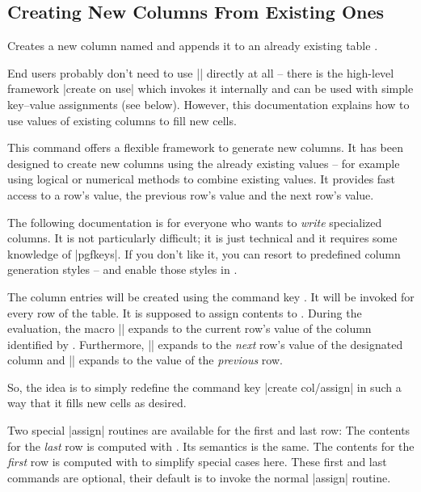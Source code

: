 \subsection{Creating New Columns From Existing Ones}

\begin{command}{\pgfplotstablecreatecol{}}
    Creates a new column named  and appends it to an already
    existing table .

    End users probably don't need to use |\pgfplotstablecreatecol| directly at
    all -- there is the high-level framework |create on use| which invokes it
    internally and can be used with simple key--value assignments (see below).
    However, this documentation explains how to use values of existing columns
    to fill new cells.

    This command offers a flexible framework to generate new columns. It has
    been designed to create new columns using the already existing values --
    for example using logical or numerical methods to combine existing values.
    It provides fast access to a row's value, the previous row's value and the
    next row's value.

    The following documentation is for everyone who wants to \emph{write}
    specialized columns. It is not particularly difficult; it is just technical
    and it requires some knowledge of |pgfkeys|. If you don't like it, you can
    resort to predefined column generation styles -- and enable those styles in
    .

    The column entries will be created using the command key
    .
    It will be invoked for every row of the table. It is supposed to assign
    contents to
    .
    During the evaluation, the macro |\thisrow| expands to the
    current row's value of the column identified by .
    Furthermore, |\nextrow| expands to the \emph{next} row's
    value of the designated column and |\prevrow| expands to the
    value of the \emph{previous} row.

    So, the idea is to simply redefine the command key |create col/assign| in
    such a way that it fills new cells as desired.

    Two special |assign| routines are available for the first and last row: The
    contents for the \emph{last} row is computed with
    .
    Its semantics is the same. The contents for the \emph{first} row is
    computed with
    to simplify special cases here. These first and last commands are optional,
    their default is to invoke the normal |assign| routine.


\end{command}
